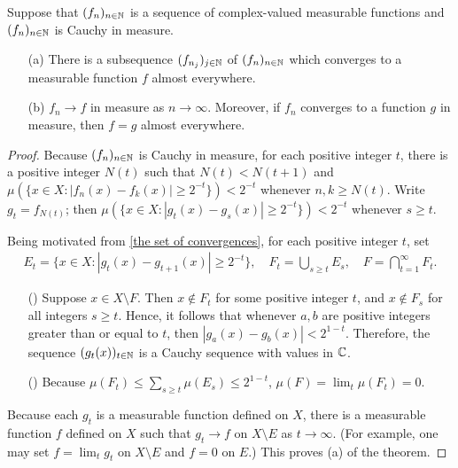 \begin{thm}
    Suppose that $(f_n)_{n\in{\mathbb{N}}}$ is a sequence of complex-valued measurable functions and $(f_n)_{n\in{\mathbb{N}}}$ is Cauchy in measure.
    \begin{enumerate}
        \item[(a)]
        {
            There is a subsequence $(f_{n_j})_{j\in{\mathbb{N}}}$ of $(f_n)_{n\in{\mathbb{N}}}$ which converges to a measurable function $f$ almost everywhere.
        }
        \item[(b)]
        {
            $f_n\rightarrow f$ in measure as $n\rightarrow\infty$.
            Moreover, if $f_n$ converges to a function $g$ in measure, then $f=g$ almost everywhere.
        }
    \end{enumerate}
\end{thm}
\begin{proof}
    Because $(f_n)_{n\in{\mathbb{N}}}$ is Cauchy in measure, for each positive integer $t$, there is a positive integer $N(t)$ such that $N(t)<N(t+1)$ and $\mu(\{x\in X: |f_n(x)-f_k(x)|\geq 2^{-t}\})< 2^{-t}$ whenever $n, k\geq N(t)$.
    Write $g_t=f_{N(t)}$; then $\mu(\{x\in X: |g_t(x)-g_{s}(x)|\geq 2^{-t}\})<2^{-t}$ whenever $s\geq t$.
    
    Being motivated from \cref{the set of convergences}, for each positive integer $t$, set
    \begin{align*}
        E_t=\{x\in X: |g_t(x)-g_{t+1}(x)|\geq 2^{-t}\},\quad
        F_t=\bigcup_{s\geq t} E_s,\quad
        F=\bigcap_{t=1}^\infty F_t.
    \end{align*}
    \begin{enumerate}
        \item[(\romannumeral 1)]
        {
            Suppose $x\in X\setminus F$.
            Then $x\notin F_t$ for some positive integer $t$, and $x\notin F_s$ for all integers $s\geq t$.
            Hence, it follows that whenever $a, b$ are positive integers greater than or equal to $t$, then $|g_a(x)-g_b(x)|<2^{1-t}$.
            Therefore, the sequence $(g_t(x))_{t\in{\mathbb{N}}}$ is a Cauchy sequence with values in ${\mathbb{C}}$.
        }
        \item[(\romannumeral 2)]
        {
            Because $\mu(F_t)\leq\sum_{s\geq t}\mu(E_s)\leq 2^{1-t}$, $\mu(F)=\lim_t\mu(F_t)=0$.
        }
    \end{enumerate}
    Because each $g_t$ is a measurable function defined on $X$, there is a measurable function $f$ defined on $X$ such that $g_t\rightarrow f$ on $X\setminus E$ as $t\rightarrow\infty$.
    (For example, one may set $f=\lim_t g_t$ on $X\setminus E$ and $f=0$ on $E$.)
    This proves (a) of the theorem.


\end{proof}
